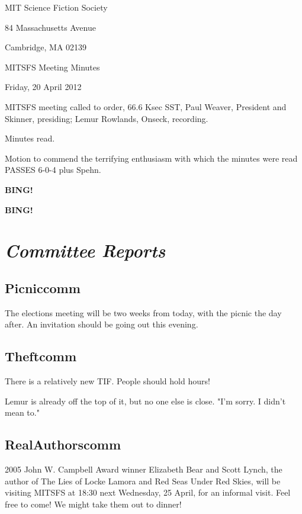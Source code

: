 \documentclass[10pt]{article}
\newcommand{\bing}{{\bf BING!} }
\newcommand{\goto}[1]{\bing \vskip 12pt \section*{{\em{#1}}}}
\newcommand{\ps}{ plus Spehn\xspace}
\newcommand{\skinner}{Paul Weaver, President and Skinner}
\newcommand{\onseck}{Lemur Rowlands, Onseck}
\newcommand{\meetingdate}{Friday, 20 April 2012}
\begin{document}
\begin{center}

MIT Science Fiction Society

84 Massachusetts Avenue

Cambridge, MA 02139

\vspace{12pt}

MITSFS Meeting Minutes

\meetingdate

\end{center}

\vspace{18pt}

\setlength{\parskip}{6pt}

\noindent
MITSFS meeting called to order, 66.6 Ksec SST,
\skinner, presiding; \onseck, recording.

Minutes read.

Motion to commend the terrifying enthusiasm with which the minutes
were read PASSES 6-0-4\ps.

\bing

\goto{Committee Reports}

\subsection*{Picniccomm}

The elections meeting will be two weeks from today, with the picnic the
day after.  An invitation should be going out this evening.


\subsection*{Theftcomm}

There is a relatively new TIF.  People should hold hours!

Lemur is already off the top of it, but no one else is close.
"I'm sorry.  I didn't mean to."


\subsection*{RealAuthorscomm}

2005 John W. Campbell Award winner Elizabeth Bear and Scott Lynch, 
the author of The Lies of Locke Lamora and Red Seas Under Red Skies, 
will be visiting MITSFS at 18:30 next Wednesday, 25 April, for an informal 
visit. Feel free to come! We might take them out to dinner! 
\end{document}
